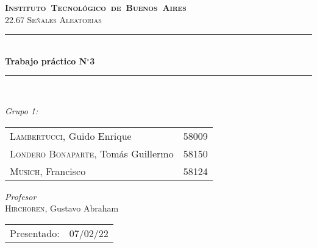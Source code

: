 \begin{titlepage}
\newcommand{\HRule}{\rule{\linewidth}{0.5mm}}
\center
\mbox{\textsc{\LARGE \bfseries {Instituto Tecnológico de Buenos Aires}}}\\[1.5cm]
\textsc{\Large 22.67 Señales Aleatorias}\\[0.5cm]


\HRule \\[0.6cm]
{ \Huge \bfseries Trabajo práctico N$^{\circ}$3}\\[0.4cm] 
\HRule \\[1.5cm]


{\large

\emph{Grupo 1:}\\
\vspace{3pt}

\begin{tabular}{lr} 	
\textsc{Lambertucci}, Guido Enrique  & 58009 \\
\textsc{Londero Bonaparte}, Tomás Guillermo  & 58150 \\
\textsc{Musich}, Francisco  & 58124\\
\end{tabular}

\vspace{20pt}

\emph{Profesor}\\
\textsc{Hirchoren}, Gustavo Abraham \\
\vspace{3pt}

\vspace{100pt}

\begin{tabular}{ll}

Presentado: & 07/02/22\\

\end{tabular}

}

\vfill

\end{titlepage}
